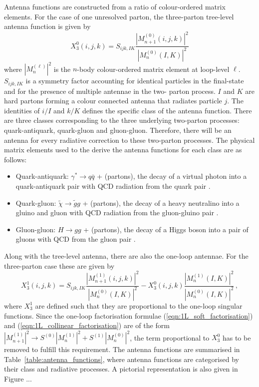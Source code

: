 \documentclass[main.tex]{subfiles}
\begin{document}
    Antenna functions are constructed from a ratio of
    colour-ordered matrix elements.
    For the case of one unresolved parton, the three-parton
    tree-level antenna function is given by
    \begin{equation}\label{eqn:X30}
        X_{3}^{0}(i, j, k) = S_{ijk,IK} \dfrac{|M_{n+1}^{(0)}(i,j,k)|^{2}}{|M_{n}^{(0)}(I,K)|^{2}}
    \end{equation}
    where $|M_{n}^{(\ell)}|^{2}$ is the $n$-body colour-ordered matrix
    element at loop-level $\ell$. $S_{ijk,IK}$ is a symmetry factor
    accounting for identical particles in the final-state
    and for the presence of multiple antennae in the two-
    parton process. $I$ and $K$ are hard partons forming a colour
    connected antenna that radiates particle $j$. The identities
    of $i/I$ and $k/K$ defines the specific class of the
    antenna function. There are three classes corresponding
    to the three underlying two-parton processes: quark-antiquark,
    quark-gluon and gluon-gluon. Therefore, there will
    be an antenna for every radiative correction to these
    two-parton processes. The physical matrix elements used
    to the derive the antenna functions for each class are as follows:
    \begin{itemize}
        \item Quark-antiquark: $\gamma^{*} \rightarrow q\bar{q}$ + (partons),
        the decay of a virtual photon into a quark-antiquark pair with QCD radiation from the quark pair \cite{Gehrmann-DeRidder:2004ttg}.
        \item Quark-gluon: $\tilde{\chi} \rightarrow \tilde{g}g$ + (partons),
        the decay of a heavy neutralino into a gluino and gluon with QCD radiation from the gluon-gluino pair \cite{Gehrmann-DeRidder:2005svg}.
        \item Gluon-gluon: $H \rightarrow gg$ + (partons),
        the decay of a Higgs boson into a pair of gluons with QCD from the gluon pair \cite{Gehrmann-DeRidder:2005alt}.
    \end{itemize}
    Along with the tree-level antenna, there are also the
    one-loop antennae. For the three-parton case these are given by
    \begin{equation}\label{eqn:X31}
        X_{3}^{1}(i,j,k) = S_{ijk,IK} \dfrac{|M_{n+1}^{(1)}(i,j,k)|^{2}}{|M_{n}^{(0)}(I,K)|^{2}} - X_{3}^{0}(i,j,k) \dfrac{|M_{n}^{(1)}(I,K)|^{2}}{|M_{n}^{(0)}(I,K)|^{2}} \, ,
    \end{equation}
    where $X_{3}^{1}$ are defined such that they are proportional
    to the one-loop singular functions. Since the one-loop
    factorisation formulae (\ref{eqn:1L_soft_factorisation})
    and (\ref{eqn:1L_collinear_factorisation}) are of the form
    $|M^{(1)}_{n+1}|^{2}\rightarrow S^{(0)}|M^{(1)}_{n}|^{2} + S^{(1)}|M^{(0)}_{n}|^{2}$,
    the term proportional to $X_{3}^{0}$ has to be removed
    to fulfill this requirement.
    The antenna functions are summarised in Table~\ref{table:antenna_functions}, where
    antenna functions are categorised by their class and radiative
    processes. A pictorial representation is also given in Figure ...
\end{document}
